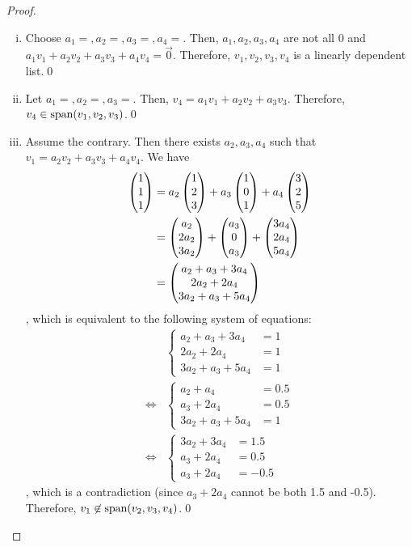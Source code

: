 \begin{proof}
    \renewcommand{\qedsymbol}{$ $}
    \begin{enumerate}[(i)]
        \renewcommand{\qedsymbol}{$\blacksquare$}
        \item Choose $a_1=, a_2=, a_3=, a_4=$. Then, $a_1,a_2,a_3,a_4$ are not all 0 and $a_1v_1+a_2v_2+a_3v_3+a_4v_4=\vec{0}$. Therefore, $v_1,v_2,v_3,v_4$ is a linearly dependent list.\qed
        \item Let $a_1=, a_2=, a_3=$. Then, $v_4=a_1v_1+a_2v_2+a_3v_3$. Therefore, $v_4\in\textnormal{span}(v_1,v_2,v_3)$.\qed
        \item Assume the contrary. Then there exists $a_2,a_3,a_4$ such that $v_1=a_2v_2+a_3v_3+a_4v_4$. We have 
        \[
            \begin{aligned}
                \begin{pmatrix} 1\\ 1\\ 1\end{pmatrix} &= a_2 \begin{pmatrix} 1\\ 2\\ 3\end{pmatrix}+a_3 \begin{pmatrix} 1\\ 0\\ 1\end{pmatrix}+a_4 \begin{pmatrix} 3\\ 2\\ 5\end{pmatrix}\\
                                      &= \begin{pmatrix} a_2\\ 2a_2\\ 3a_2\end{pmatrix}+\begin{pmatrix} a_3\\ 0\\ a_3\end{pmatrix}+\begin{pmatrix} 3a_4\\ 2a_4\\ 5a_4\end{pmatrix}\\
                                      &= \begin{pmatrix} a_2+a_3+3a_4\\ 2a_2+2a_4\\ 3a_2+a_3+5a_4\end{pmatrix}
            \end{aligned}
        \]
        , which is equivalent to the following system of equations: 
        \begin{align*}
            &\begin{cases}
                a_2+a_3+3a_4 &= 1\\
                2a_2+2a_4    &= 1\\
                3a_2+a_3+5a_4&= 1
            \end{cases}\\
            \iff
            &\begin{cases}
                a_2+a_4      &= 0.5\\
                a_3+2a_4     &= 0.5\\
                3a_2+a_3+5a_4&= 1
            \end{cases}\\
            \iff
            &\begin{cases}
                3a_2+3a_4    &= 1.5\\
                a_3+2a_4     &= 0.5\\
                a_3+2a_4     &= -0.5
            \end{cases}
        \end{align*}
        , which is a contradiction (since $a_3+2a_4$ cannot be both 1.5 and -0.5). Therefore, $v_1\not\in\textnormal{span}{(v_2,v_3,v_4)}$.\qed
    \end{enumerate}
\end{proof}